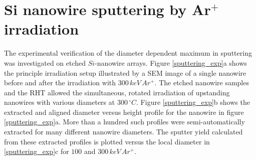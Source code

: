 



\section{Si nanowire sputtering by Ar$^+$ irradiation}
\label{sec:sisputtering}

The experimental verification of the diameter dependent maximum in sputtering was investigated on etched $Si$-nanowire arrays. Figure \ref{sputtering_exp}a shows the principle irradiation setup illustrated by a SEM image of a single nanowire before and after the irradiation with $300\,keV\,Ar^+$. The etched nanowire samples and the RHT allowed the simultaneous, rotated irradiation of upstanding nanowires with various diameters at $300\,^\circ C$. Figure \ref{sputtering_exp}b shows the extracted and aligned diameter versus height profile for the nanowire in figure \ref{sputtering_exp}a. More than a hundred such profiles were semi-automatically extracted for many different nanowire diameters. The sputter yield calculated from these extracted profiles is plotted versus the local diameter in \ref{sputtering_exp}c for $100$ and $300\,keV\,Ar^+$.

